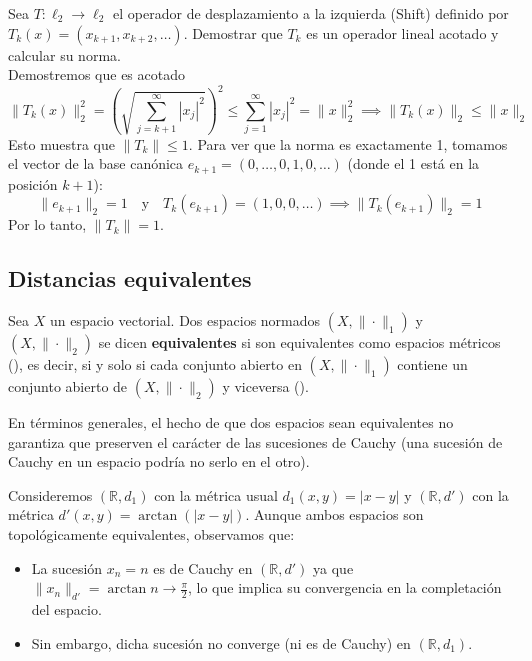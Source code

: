 \begin{ejercicio}
    Sea $T: \ell_2 \to \ell_2$ el operador de desplazamiento a la izquierda (Shift) definido por $T_k(x) = (x_{k+1}, x_{k+2}, \dots)$. Demostrar que $T_k$ es un operador lineal acotado y calcular su norma. \\
    \noindent
    Demostremos que es acotado
    \begin{equation*}
        \|T_k(x)\|_2^2 = \left(\sqrt{\sum_{j=k+1}^{\infty} |x_j|^2} \right)^2 \le \sum_{j=1}^{\infty} |x_j|^2 = \|x\|_2^2 \implies \|T_k(x)\|_2 \le \|x\|_2
    \end{equation*}
    Esto muestra que $\|T_k\| \le 1$. Para ver que la norma es exactamente 1, tomamos el vector de la base canónica $e_{k+1} = (0, \dots, 0, 1, 0, \dots)$ (donde el 1 está en la posición $k+1$):
    \begin{equation*}
        \|e_{k+1}\|_2 = 1 \quad \text{y} \quad T_k(e_{k+1}) = (1, 0, 0, \dots) \implies \|T_k(e_{k+1})\|_2 = 1
    \end{equation*}
    Por lo tanto, $\|T_k\| = 1$.
\end{ejercicio}

\subsection{Distancias equivalentes}

\begin{definicion}
    Sea $X$ un espacio vectorial. Dos espacios normados $(X, \|\cdot\|_1)$ y $(X, \|\cdot\|_2)$ se dicen \textbf{equivalentes} si son equivalentes como espacios métricos (), es decir, si y solo si cada conjunto abierto en $(X, \|\cdot\|_1)$ contiene un conjunto abierto de $(X, \|\cdot\|_2)$ y viceversa ().
\end{definicion}

\begin{observacion}
    En términos generales, el hecho de que dos espacios sean equivalentes no garantiza que preserven el carácter de las sucesiones de Cauchy (una sucesión de Cauchy en un espacio podría no serlo en el otro).
\end{observacion}

\begin{ejemplo}
    Consideremos $(\mathbb{R}, d_1)$ con la métrica usual $d_1(x, y) = |x - y|$ y $(\mathbb{R}, d')$ con la métrica $d'(x, y) = \arctan(|x - y|)$. Aunque ambos espacios son topológicamente equivalentes, observamos que:
    \begin{itemize}
        \item La sucesión $x_n = n$ es de Cauchy en $(\mathbb{R}, d')$ ya que $\|x_n\|_{d'} = \arctan n \longrightarrow \frac{\pi}{2}$, lo que implica su convergencia en la completación del espacio.
        \item Sin embargo, dicha sucesión no converge (ni es de Cauchy) en $(\mathbb{R}, d_1)$.
    \end{itemize}
\end{ejemplo}

